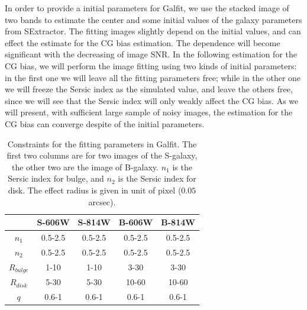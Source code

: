 \documentclass[useAMS,usenatbib]{mn2e}
\begin{document}
In order to provide a initial parameters for Galfit, we use the
stacked image of two bands to estimate the center and some initial
values of the galaxy parameters from SExtractor. The fitting images
slightly depend on the initial values, and can effect the estimate for
the CG bias estimation.  The dependence will become significant with
the decreasing of image SNR.  In the following estimation for the CG
bias, we will perform the image fitting using two kinds of initial
parameters: in the first one we will leave all the fitting parameters
free; while in the other one we will freeze the Sersic index as the
simulated value, and leave the others free, since we will see that the
Sersic index will only weakly affect the CG bias.  As we will present,
with sufficient large sample of noisy images, the estimation for the
CG bias can converge despite of the initial parameters.

%
\begin{center}
\begin{table}
\begin{tabular}{|c|c|c|c|c|}
\hline\hline
 &S-606W  & S-814W  & B-606W & B-814W \\ \hline
$n_1$ &0.5-2.5  &0.5-2.5  &0.5-2.5 &0.5-2.5 \\ \hline
$n_2$ &0.5-2.5  &0.5-2.5  &0.5-2.5 &0.5-2.5 \\ \hline
$R_{bulge}$ &1-10 &1-10  &3-30  &3-30  \\ \hline
$R_{disk}$  &5-30 &5-30  &10-60 &10-60 \\ \hline
$q$      &0.6-1  &0.6-1  &0.6-1 &0.6-1 \\ \hline
\hline
\end{tabular}
\caption{\label{fitpar} Constraints for the fitting parameters in Galfit.
The first two columns are for two images of the S-galaxy, the other two are
the image of B-galaxy.
$n_1$ is the Sersic index for bulge, and $n_2$ is the Sersic index for disk.
The effect radius is given in unit of pixel ($0.05$ arcsec).}
\end{table}
\end{center}
%
\end{document}
